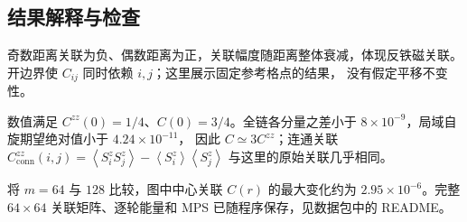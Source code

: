 \documentclass[UTF8,a4paper,zihao=5,fontset=fandol]{ctexart}
\newcommand{\avg}[1]{\left\langle #1\right\rangle}
\begin{document}
\subsection*{结果解释与检查}
奇数距离关联为负、偶数距离为正，关联幅度随距离整体衰减，体现反铁磁关联。
开边界使 $C_{ij}$ 同时依赖 $i,j$；这里展示固定参考格点的结果，
没有假定平移不变性。

数值满足 $C^{zz}(0)=1/4$、$C(0)=3/4$。全链各分量之差小于
$8\times10^{-9}$，局域自旋期望绝对值小于 $4.24\times10^{-11}$，
因此 $C\simeq3C^{zz}$；连通关联
$C_{\mathrm{conn}}^{zz}(i,j)=\avg{S_i^zS_j^z}-\avg{S_i^z}\avg{S_j^z}$
与这里的原始关联几乎相同。

将 $m=64$ 与 $128$ 比较，图中中心关联 $C(r)$ 的最大变化约为
$2.95\times10^{-6}$。完整 $64\times64$ 关联矩阵、逐轮能量和 MPS
已随程序保存，见数据包中的 README。
\end{document}
